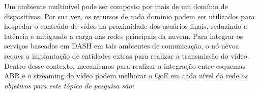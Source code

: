 Um ambiente multinível pode ser composto por mais de um domínio de dispositivos. Por sua vez, 
os recursos de cada domínio podem ser utilizados para hospedar o conteúdo de vídeo na proximidade dos usuários finais, reduzindo a latência e mitigando a carga nas redes principais da nuvem.
Para integrar os serviços baseados em DASH em tais ambientes de comunicação, o nó névoa requer a implantação de entidades extras para realizar a transmissão do vídeo.
Dentro desse contexto, 
mecanismos para realizar a integração entre esquemas ABR e o streaming do vídeo podem melhorar o QoE em cada nível da rede,\emph{os objetivos para este tópico de pesquisa são: }  





